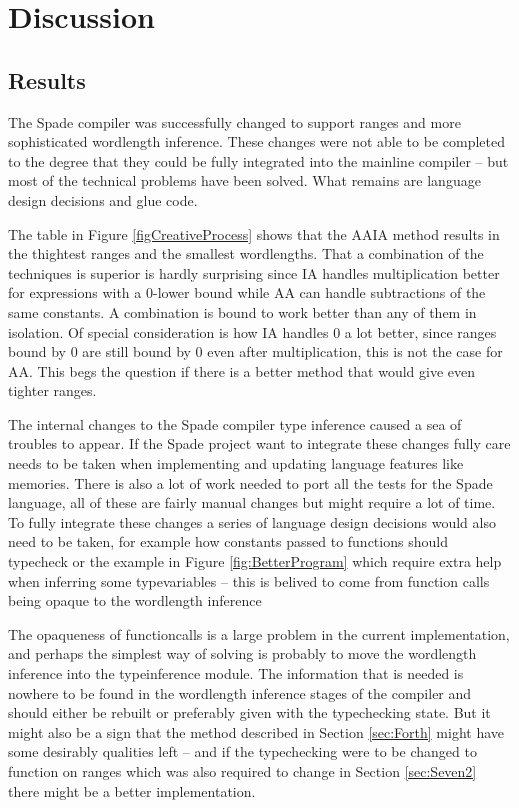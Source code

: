 \chapter{Discussion}
\label{cha:Discussion}

\section{Results}
The Spade compiler was successfully changed to support ranges and more sophisticated wordlength inference. These changes were not able to be completed to the degree that they could be fully integrated into the mainline compiler -- but most of the technical problems have been solved. What remains are language design decisions and glue code.

The table in Figure \ref{figCreativeProcess} shows that the AAIA method results in the thightest ranges and the smallest wordlengths. That a combination of the techniques is superior is hardly surprising since IA handles multiplication better for expressions with a 0-lower bound while AA can handle subtractions of the same constants. A combination is bound to work better than any of them in isolation. Of special consideration is how IA handles $0$ a lot better, since ranges bound by 0 are still bound by $0$ even after multiplication, this is not the case for AA. This begs the question if there is a better method that would give even tighter ranges.

The internal changes to the Spade compiler type inference caused a sea of troubles to appear. If the Spade project want to integrate these changes fully care needs to be taken when implementing and updating language features like memories. There is also a lot of work needed to port all the tests for the Spade language, all of these are fairly manual changes but might require a lot of time. To fully integrate these changes a series of language design decisions would also need to be taken, for example how constants passed to functions should typecheck or the example in Figure \ref{fig:BetterProgram} which require extra help when inferring some typevariables -- this is belived to come from function calls being opaque to the wordlength inference

The opaqueness of functioncalls is a large problem in the current implementation, and perhaps the simplest way of solving is probably to move the wordlength inference into the typeinference module. The information that is needed is nowhere to be found in the wordlength inference stages of the compiler and should either be rebuilt or preferably given with the typechecking state. But it might also be a sign that the method described in Section \ref{sec:Forth} might have some desirably qualities left -- and if the typechecking were to be changed to function on ranges which was also required to change in Section \ref{sec:Seven2} there might be a better implementation.

